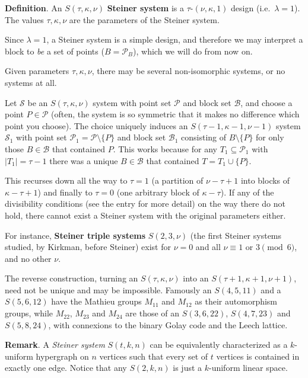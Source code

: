 \documentclass[12pt]{article}
\begin{document}
\textbf{Definition}.  An $S(\tau,\kappa,\nu)$ {\bf Steiner system} is a $\tau$-$(\nu,\kappa,1)$ design (i.e.\ $\lambda=1$).  The values $\tau,\kappa,\nu$ are the parameters of the Steiner system.

Since $\lambda=1$, a Steiner system is a simple design, and therefore we may interpret a block to {\em be\/} a set of points ($B=\mathcal{P}_B$), which we will do from now on.

Given parameters $\tau,\kappa,\nu$, there may be several non-isomorphic systems, or no systems at all.

Let $\mathcal{S}$ be an $S(\tau,\kappa,\nu)$ system with point set $\mathcal{P}$ and block set $\mathcal{B}$, and choose a point $P\in \mathcal{P}$ (often, the system is so symmetric that it makes no difference which point you choose).  The choice uniquely induces an $S(\tau-1,\kappa-1,\nu-1)$ system $\mathcal{S}_1$ with point set $\mathcal{P}_1 = \mathcal{P}\setminus \{P\}$ and block set $\mathcal{B}_1$ consisting of $B\setminus\{P\}$ for only those $B\in\mathcal{B}$ that contained $P$.  This works because for any $T_1\subseteq\mathcal{P}_1$ with $|T_1|=\tau-1$ there was a unique $B\in\mathcal{B}$ that contained $T=T_1\cup\{P \}$.

This recurses down all the way to $\tau=1$ (a partition of $\nu-\tau+1$ into blocks of $\kappa-\tau+1$) and finally to $\tau=0$ (one arbitrary block of $\kappa-\tau$). If any of the divisibility conditions (see the entry  for more detail) on the way there do not hold, there cannot exist a Steiner system with the original parameters either.

For instance, {\bf Steiner triple systems} $S(2,3,\nu)$ (the first Steiner systems studied, by Kirkman, before Steiner) exist for $\nu=0$ and all $\nu\equiv1$ or $3\pmod6$, and no other $\nu$.

The reverse construction, turning an $S(\tau,\kappa,\nu)$ into an $S(\tau+1, \kappa+1, \nu+1)$, need not be unique and may be impossible. Famously an $S(4,5,11)$ and a $S(5,6,12)$ have the Mathieu groups $M_{11}$ and $M_{12}$ as their automorphism groups, while $M_{22}$, $M_{23}$ and $M_{24}$ are those of an $S(3,6,22)$, $S(4,7,23)$ and $S(5,8,24)$,
with connexions to the binary Golay code and the Leech lattice.

\textbf{Remark}.  A \emph{Steiner system} $S(t,k,n)$ can be equivalently characterized as a $k$-uniform hypergraph on $n$ vertices such that every set of $t$ vertices is contained in exactly one edge.  Notice that any $S(2,k,n)$ is just a $k$-uniform linear space.
\end{document}
